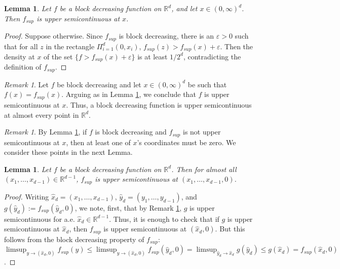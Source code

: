 \documentclass[12pt]{amsart}
\numberwithin{equation}{section}
\theoremstyle{plain}
\newtheorem{lemma}[theorem]{Lemma}
\theoremstyle{definition}
\theoremstyle{remark}
\newtheorem{remark}[theorem]{Remark}
\begin{document}
\begin{lemma}\label{fsuppos}
  Let $f$ be a block decreasing function on $\mathbb{R}^d$, and let
  $x\in (0,\infty)^d$. Then $f_{sup}$ is upper semicontinuous
at $x$.
\end{lemma}
\begin{proof}
Suppose otherwise. Since $f_{sup}$ is block decreasing,  there
is an $\varepsilon>0$
such that for all $z$ in the rectangle $
  \Pi_{i=1}^d(0,x_i)$, $f_{sup}(z)>f_{sup}(x)+\varepsilon$.
  Then the density at $x$ of the set
  $\{f>f_{sup}(x)+\varepsilon\}$ is at least $1/2^d$,
  contradicting the definition of $f_{sup}$.
\end{proof}

\begin{remark}\label{corollary}
Let $f$ be  block decreasing and let $x\in (0,\infty)^d$ be
such that $f(x)=f_{sup}(x)$. Arguing as in Lemma
\ref{fsuppos}, we conclude that $f$ is upper semicontinuous at $x$.
Thus, a block decreasing
function is upper semicontinuous at almost every point in $\mathbb{R}^d$.
\end{remark}

\begin{remark}
  \label{fsupupcontae}
 By Lemma
\ref{fsuppos}, if $f$ is block decreasing and
 $f_{sup}$ is not upper semicontinuous  at $x$, then
  at least one of $x$'s coordinates must be zero.
We consider these points  in the next Lemma.
\end{remark}

\begin{lemma}\label{lem0}
  Let $f$ be a block decreasing function on $\mathbb{R}^d$. Then
  for almost all  $(x_1,\ldots,x_{d-1})\in\mathbb{R}^{d-1}$, $f_{sup}$ is upper
  semicontinuous  at $(x_1,\ldots,x_{d-1},0)$.
\end{lemma}
\begin{proof}
Writing $\hat{x}_d=(x_1,\ldots,x_{d-1})$,
  $\hat{y}_d=(y_1,\ldots,y_{d-1})$, and
  $g(\hat{y}_d):=f_{sup}(\hat{y}_d,0)$, we note,
first, that by Remark \ref{corollary}, $g$ is upper semicontinuous for a.e.
  $\hat{x}_d\in\mathbb{R}^{d-1}$. Thus, it is enough to check that if $g$ is
  upper semicontinuous at $\hat{x}_d$, then $f_{sup}$ is upper
  semicontinuous at $(\hat{x}_d,0)$. But this follows from the
  block decreasing property of $f_{sup}$:
$\limsup_{y\to (\hat{x}_d,0)} f_{sup}(y) \le \limsup_{y\to (\hat{x}_d,0)}
f_{sup} (\hat{y}_d,0) = \limsup_{\hat{y}_d\to \hat{x}_d}
g(\hat{y}_d) \le g(\hat{x}_d) = f_{sup}(\hat{x}_d,0)$.
\end{proof}
\end{document}
